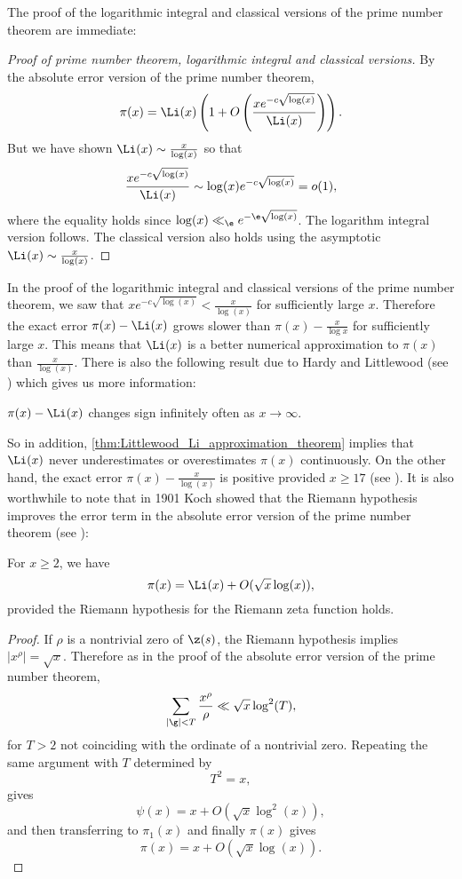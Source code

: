     The proof of the logarithmic integral and classical versions of the prime number theorem are immediate:

    \begin{proof}[Proof of prime number theorem, logarithmic integral and classical versions]
      By the absolute error version of the prime number theorem,
      \[
        \pi(x) = \Li(x)\left(1+O\left(\frac{xe^{-c\sqrt{\log(x)}}}{\Li(x)}\right)\right).
      \]
      But we have shown $\Li(x) \sim \frac{x}{\log(x)}$ so that
      \[
        \frac{xe^{-c\sqrt{\log(x)}}}{\Li(x)} \sim \log(x)e^{-c\sqrt{\log(x)}} = o(1),
      \]
      where the equality holds since $\log(x) \ll_{\e} e^{-\e\sqrt{\log(x)}}$. The logarithm integral version follows. The classical version also holds using the asymptotic $\Li(x) \sim \frac{x}{\log(x)}$.
    \end{proof}
    
    In the proof of the logarithmic integral and classical versions of the prime number theorem, we saw that $xe^{-c\sqrt{\log(x)}} < \frac{x}{\log(x)}$ for sufficiently large $x$. Therefore the exact error $\pi(x)-\Li(x)$ grows slower than $\pi(x)-\frac{x}{\log{x}}$ for sufficiently large $x$. This means that $\Li(x)$ is a better numerical approximation to $\pi(x)$ than $\frac{x}{\log(x)}$. There is also the following result due to Hardy and Littlewood (see \cite{hardy1916contributions}) which gives us more information:

    \begin{proposition}\label{thm:Littlewood_Li_approximation_theorem}
      $\pi(x)-\Li(x)$ changes sign infinitely often as $x \to \infty$.
    \end{proposition}

    So in addition, \cref{thm:Littlewood_Li_approximation_theorem} implies that $\Li(x)$ never underestimates or overestimates $\pi(x)$ continuously. On the other hand, the exact error $\pi(x)-\frac{x}{\log(x)}$ is positive provided $x \ge 17$ (see \cite{rosser1962approximate}). It is also worthwhile to note that in 1901 Koch showed that the Riemann hypothesis improves the error term in the absolute error version of the prime number theorem (see \cite{von1901distribution}):

    \begin{proposition}
      For $x \ge 2$, we have
      \[
        \pi(x) = \Li(x)+O(\sqrt{x}\log(x)),
      \]
      provided the Riemann hypothesis for the Riemann zeta function holds.
    \end{proposition}
    \begin{proof}
      If $\rho$ is a nontrivial zero of $\z(s)$, the Riemann hypothesis implies $|x^{\rho}| = \sqrt{x}$. Therefore as in the proof of the absolute error version of the prime number theorem,
      \[
        \sum_{|\g| < T}\frac{x^{\rho}}{\rho} \ll \sqrt{x}\log^{2}(T),
      \]
      for $T > 2$ not coinciding with the ordinate of a nontrivial zero. Repeating the same argument with $T$ determined by
      \[
        T^{2} = x,
      \]
      gives
      \[
        \psi(x) = x+O(\sqrt{x}\log^{2}(x)),
      \]
      and then transferring to $\pi_{1}(x)$ and finally $\pi(x)$ gives
      \[
        \pi(x) = x+O(\sqrt{x}\log(x)).
      \]
    \end{proof}
